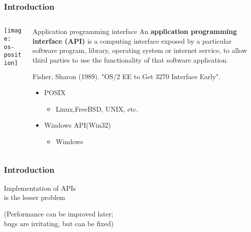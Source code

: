 \begin{frame}[plain]
	\frametitle{Introduction}
	
	
	
	\begin{columns}
		
		\begin{column}{.4\textwidth}
			
			\texttt{[image: os-position]}
			
		\end{column}
		
		\begin{column}{.6\textwidth}
			
			\begin{block}{Application programming interface}
				An \textbf{application programming interface (API) }is a computing interface exposed by a particular software program, library, operating system or internet service, to allow third parties to use the functionality of that software application.
			\end{block} 
			\tiny Fisher, Sharon (1989). "OS/2 EE to Get 3270 Interface Early". 
			
			\normalsize
			\begin{itemize}
				\item POSIX
				\begin{itemize}
					\item Linux,FreeBSD, UNIX, etc.
					
				\end{itemize}
			
				\item Windows API(Win32)
				\begin{itemize}
					\item Windows
				
				\end{itemize}
			\end{itemize}
		\end{column}
		
		
	\end{columns}
	
	
\end{frame}


\begin{frame}[plain]
	\frametitle{Introduction}
	
	\begin{center}
	\Huge 
	Implementation of APIs \\
	is the lesser problem
	
	
	\normalsize
	(Performance can be improved later; \\
	bugs are irritating, but can be fixed)
	
	\end{center}

	
\end{frame}


